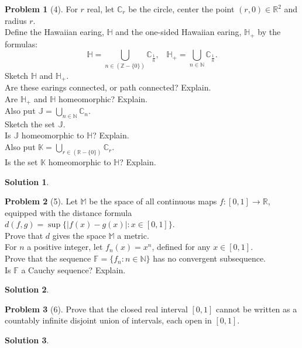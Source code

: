 \documentclass{article}
\theoremstyle{definition}
\newtheorem*{soln}{Solution}
\newtheorem*{prob}{Problem}
\theoremstyle{theorem}
\begin{document}
\begin{prob}[4]
For $r$ real, let $\mathbb{C}_r$ be the circle, center the point  $(r, 0) \in \mathbb{R}^2$ and radius $r$. \\ Define the Hawaiian earing, $\mathbb{H}$ and the one-sided Hawaiian earing, $\mathbb{H}_+$ by the formulas:
\[ \mathbb{H} =   \bigcup_{n \in (\mathbb{Z} - \{0\})} \mathbb{C}_{\frac{1}{n}}, \hspace{10pt} \mathbb{H}_+ =   \bigcup_{n \in \mathbb{N}} \mathbb{C}_{\frac{1}{n}}. \] 
Sketch $\mathbb{H}$ and $\mathbb{H}_+$.\\
Are these earings connected, or path connected? Explain. \\
Are $\mathbb{H}_+$ and $\mathbb{H}$ homeomorphic? Explain.\\
Also put $\mathbb{J} =  \bigcup_{n \in \mathbb{N}} \mathbb{C}_{n}$.\\
Sketch the set $\mathbb{J}$.\\
Is $\mathbb{J}$ homeomorphic to $\mathbb{H}$? Explain.\\
Also put $\mathbb{K} =  \bigcup_{r \in (\mathbb{R} - \{0\})} \mathbb{C}_{r}$.\\
Is the set $\mathbb{K}$ homeomorphic to $\mathbb{H}$? Explain.


\end{prob}
\begin{soln}

\end{soln}
\vspace{1in}


\begin{prob}[5]
Let $\mathbb{M}$ be the space of all continuous maps $f:[0, 1] \rightarrow \mathbb{R}$, equipped with the distance formula $d(f,g ) =  \sup\{ |f(x) - g(x)|:  x \in [0, 1]\}$.  \\Prove that $d$ gives the space $\mathbb{M}$ a metric.   \\For $n$ a positive integer, let $f_n(x) = x^n$, defined for any $x\in [0, 1]$. \\ Prove that the sequence $\mathbb{F} = \{f_n: n \in \mathbb{N}\}$ has no convergent subsequence. \\ Is $\mathbb{F}$ a Cauchy sequence? Explain. 
\end{prob}
\begin{soln}

\end{soln}
\vspace{1in}


\begin{prob}[6]
Prove that the closed real interval $[0, 1]$ cannot be written as a countably infinite disjoint union of intervals, each open in $[0, 1]$. 
\end{prob}
\begin{soln}

\end{soln}
\vspace{1in}
\end{document}
